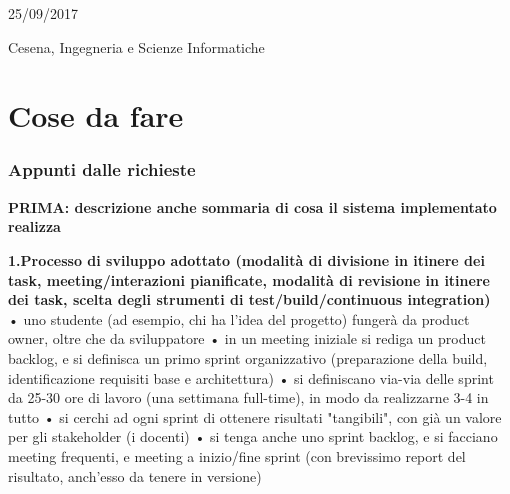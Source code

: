 \documentclass[10pt,english]{article}
\begin{document}
\begin{titlepage}
	\vspace{0.5\baselineskip} %
	
	
	\vfill %
	
	
	\vspace{0.3\baselineskip} %
	
	25/09/2017 %
	
	{\large Cesena, Ingegneria e Scienze Informatiche} %

\end{titlepage}

\section*{Cose da fare}

\subsubsection*{Appunti dalle richieste}

\textbf{PRIMA: descrizione anche sommaria di cosa il sistema implementato realizza}

\textbf{1.Processo di sviluppo adottato (modalità di divisione in itinere dei task, meeting/interazioni pianificate, modalità di revisione in itinere dei task, scelta degli strumenti di test/build/continuous integration)} \\

•	uno studente (ad esempio, chi ha l'idea del progetto) fungerà da product owner, oltre che da sviluppatore
•	in un meeting iniziale si rediga un product backlog, e si definisca un primo sprint organizzativo (preparazione della build, identificazione requisiti base e architettura)
•	si definiscano via-via delle sprint da 25-30 ore di lavoro (una settimana full-time), in modo da realizzarne 3-4 in tutto
•	si cerchi ad ogni sprint di ottenere risultati "tangibili", con già un valore per gli stakeholder (i docenti)
•	si tenga anche uno sprint backlog, e si facciano meeting frequenti, e meeting a inizio/fine sprint (con brevissimo report del risultato, anch'esso da tenere in versione)
\end{document}
